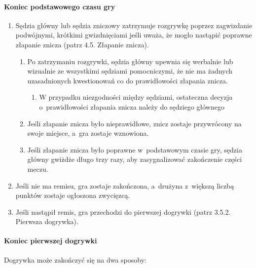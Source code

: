 \documentclass[12pt]{article}
\begin{document}
\paragraph{Koniec podstawowego czasu gry}
\begin{enumerate}
	\item Sędzia główny lub sędzia zniczowy zatrzymuje rozgrywkę poprzez
	      zagwizdanie podwójnymi, krótkimi gwizdnięciami jeśli uważa, że mogło
	      nastąpić poprawne złapanie znicza (patrz 4.5. Złapanie znicza).
	      \begin{enumerate}
		      \item Po zatrzymaniu rozgrywki, sędzia główny upewnia się werbalnie lub
		            wizualnie ze wszystkimi sędziami pomocniczymi, że nie ma żadnych
		            uzasadnionych kwestionowań co do prawidłowości złapania znicza.

		            \begin{enumerate}
			            \item
			                  W przypadku niezgodności między sędziami, ostateczna decyzja o~prawidłowości złapania znicza należy do sędziego głównego
		            \end{enumerate}

		      \item Jeśli złapanie znicza było nieprawidłowe, znicz zostaje przywrócony
		            na swoje miejsce, a~gra zostaje wznowiona.

		      \item Jeśli złapanie znicza było poprawne w~podstawowym czasie gry,
		            sędzia główny gwiżdże długo trzy razy, aby zasygnalizować zakończenie
		            części meczu.
	      \end{enumerate}

	\item Jeśli nie ma remisu, gra zostaje zakończona, a~drużyna z~większą
	      liczbą punktów zostaje ogłoszona zwycięzcą.

	\item Jeśli nastąpił remis, gra przechodzi do pierwszej dogrywki (patrz
	      3.5.2. Pierwsza dogrywka).
\end{enumerate}

\paragraph{Koniec pierwszej dogrywki}
Dogrywka może zakończyć
się na dwa sposoby:
\end{document}
